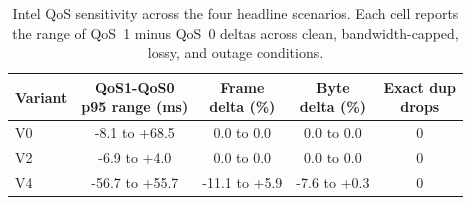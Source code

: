 \begin{table}[t]
\centering
\caption{Intel QoS sensitivity across the four headline scenarios. Each cell reports the range of QoS~1 minus QoS~0 deltas across clean, bandwidth-capped, lossy, and outage conditions.}
\label{tab:intel-qos-delta}
\scriptsize
\setlength{\tabcolsep}{3pt}
\renewcommand{\arraystretch}{1.03}
\begin{adjustbox}{max width=\columnwidth}
\begin{tabular}{@{}lcccc@{}}
\toprule
Variant & \makecell[r]{QoS1-QoS0\\p95 range (ms)} & \makecell[r]{Frame\\delta (\%)} & \makecell[r]{Byte\\delta (\%)} & \makecell[c]{Exact dup\\drops} \\
\midrule
V0 & -8.1 to +68.5 & 0.0 to 0.0 & 0.0 to 0.0 & 0 \\
V2 & -6.9 to +4.0 & 0.0 to 0.0 & 0.0 to 0.0 & 0 \\
V4 & -56.7 to +55.7 & -11.1 to +5.9 & -7.6 to +0.3 & 0 \\
\bottomrule
\end{tabular}
\end{adjustbox}
\end{table}
